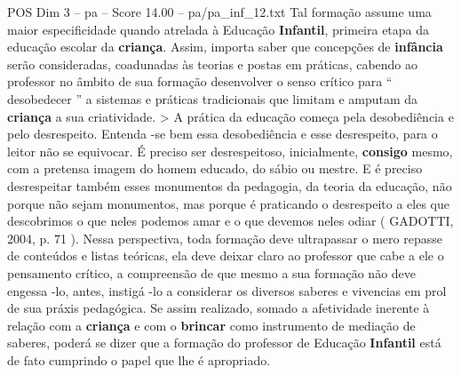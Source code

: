 \begin{textsample}{POS Dim 3 – pa – Score 14.00 – pa/pa\_inf\_12.txt}
Tal formação assume uma maior especificidade quando atrelada à Educação \textbf{Infantil}, primeira etapa da educação escolar da \textbf{criança}.
Assim, importa saber que concepções de \textbf{infância} serão consideradas, coadunadas às teorias e postas em práticas, cabendo ao professor no âmbito de sua formação desenvolver o senso crítico para “ desobedecer ” a sistemas e práticas tradicionais que limitam e amputam da \textbf{criança} a sua criatividade. > A prática da educação começa pela desobediência e pelo desrespeito.
Entenda -se bem essa desobediência e esse desrespeito, para o leitor não se equivocar.
É preciso ser desrespeitoso, inicialmente, \textbf{consigo} mesmo, com a pretensa imagem do homem educado, do sábio ou mestre.
E é preciso desrespeitar também esses monumentos da pedagogia, da teoria da educação, não porque não sejam monumentos, mas porque é praticando o desrespeito a eles que descobrimos o que neles podemos amar e o que devemos neles odiar ( GADOTTI, 2004, p. 71 ).
Nessa perspectiva, toda formação deve ultrapassar o mero repasse de conteúdos e listas teóricas, ela deve deixar claro ao professor que cabe a ele o pensamento crítico, a compreensão de que mesmo a sua formação não deve engessa -lo, antes, instigá -lo a considerar os diversos saberes e vivencias em prol de sua práxis pedagógica.
Se assim realizado, somado a afetividade inerente à relação com a \textbf{criança} e com o \textbf{brincar} como instrumento de mediação de saberes, poderá se dizer que a formação do professor de Educação \textbf{Infantil} está de fato cumprindo o papel que lhe é apropriado.

\end{textsample}
